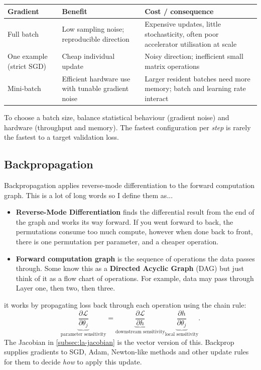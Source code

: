 \begin{center}
    \small
    \begin{tabularx}{.96\linewidth}{@{}L{.21\linewidth}YY@{}}
    \toprule
    \textbf{Gradient} & \textbf{Benefit} & \textbf{Cost / consequence} \\
    \midrule
    Full batch & Low sampling noise; reproducible direction & Expensive updates, little stochasticity, often poor accelerator utilisation at scale \\
    One example (strict SGD) & Cheap individual update & Noisy direction; inefficient small matrix operations \\
    Mini-batch & Efficient hardware use with tunable gradient noise & Larger resident batches need more memory; batch and learning rate interact \\
    \bottomrule
    \end{tabularx}
\end{center}

To choose a batch size, balance statistical behaviour (gradient noise) and hardware (throughput and memory).
The fastest configuration per \emph{step} is rarely the fastest to a target validation loss.

\subsection{Backpropagation}
\label{sec:optimisation-backpropagation-how-gradients-are-calculated}
Backpropagation applies reverse-mode differentiation to the forward computation graph.
This is a lot of long words so I define them as...
\begin{itemize}
    \item \textbf{Reverse-Mode Differentiation} finds the differential result from the end of the graph and works its way forward. 
    If you went forward to back, the permutations consume too much compute, however when done back to front, there is one permutation per parameter, and a cheaper operation.
    \item \textbf{Forward computation graph} is the sequence of operations the data passes through. 
    Some know this as a \textbf{Directed Acyclic Graph} (DAG) but just think of it as a flow chart of operations. 
    For example, data may pass through Layer one, then two, then three.
\end{itemize}

it works by propagating loss back through each operation using the chain rule:
\[
    \underbrace{\frac{\partial\mathcal L}{\partial\theta_j}}_{\text{parameter sensitivity}}
    =
    \underbrace{\frac{\partial\mathcal L}{\partial h}}_{\text{downstream sensitivity}}
    \underbrace{\frac{\partial h}{\partial\theta_j}}_{\text{local sensitivity}}.
\]
The Jacobian in \cref{subsec:la-jacobian} is the vector version of this.
Backprop supplies gradients to SGD, Adam, Newton-like methods and other update rules for them to decide \textit{how} to apply this update.

